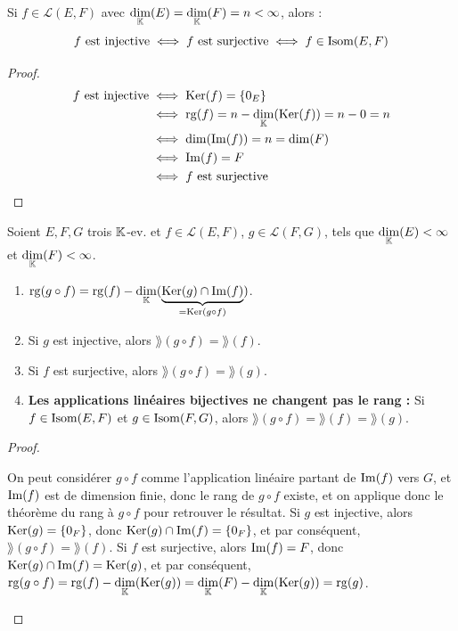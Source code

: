 \documentclass[12pt,a4paper]{report}
\begin{document}
\begin{theorem}
    Si $f \in \mathcal L(E,F)$ avec $\underset{\mathbb{K}}\dim(E) = \underset{\mathbb{K}}\dim(F) = n < \infty$, alors :
    $$f \text{ est injective} \iff f \textrm{ est surjective} \iff f \in \mathrm{Isom}(E,F)$$
\end{theorem}

\begin{proof}
    \begin{align*}
    f \text{ est injective} &\iff \mathrm{Ker}(f) = \{0_E\}\\
    &\iff \mathrm{rg}(f) = n - \underset{\mathbb{K}}\dim(\mathrm{Ker}(f)) = n - 0 = n\\
    &\iff \dim(\mathrm{Im}(f)) = n = \dim(F)\\
    &\iff \mathrm{Im}(f) = F\\
    &\iff f \text{ est surjective}
    \end{align*}
\end{proof}

\begin{property}
    Soient $E, F, G$ trois $\mathbb{K}$-ev. et $f \in \mathcal L(E,F)$, $g \in \mathcal L(F,G)$, tels que $\underset{\mathbb{K}}\dim(E) < \infty$ et $\underset{\mathbb{K}}\dim(F) < \infty$.

    \begin{enumerate}
        \item $\mathrm{rg}(g\circ f) = \mathrm{rg}(f) - \underset{\mathbb{K}}\dim(\underbrace{\mathrm{Ker}(g) \cap \mathrm{Im}(f)}_{=\mathrm{Ker}(g\circ f)})$.
        \item Si $g$ est injective, alors $\rang(g\circ f) = \rang(f)$.
        \item Si $f$ est surjective, alors $\rang(g\circ f) = \rang(g)$.
        \item \textbf{Les applications linéaires bijectives ne changent pas le rang :} Si $f \in \mathrm{Isom}(E,F)$ et $g \in \mathrm{Isom}(F,G)$, alors $\rang(g\circ f) = \rang(f) = \rang(g)$.
    \end{enumerate}
\end{property}

\begin{proof}
    \begin{outline}[enumerate]
    \1 On peut considérer $g\circ f$ comme l'application linéaire partant de $\mathrm{Im}(f)$ vers $G$, et $\mathrm{Im}(f)$ est de dimension finie, donc le rang de $g\circ f$ existe, et on applique donc le théorème du rang à $g\circ f$ pour retrouver le résultat.
    \1 Si $g$ est injective, alors $\mathrm{Ker}(g) = \{0_F\}$, donc $\mathrm{Ker}(g) \cap \mathrm{Im}(f) = \{0_F\}$, et par conséquent, $\rang(g\circ f) = \rang(f)$.
    \1 Si $f$ est surjective, alors $\mathrm{Im}(f) = F$, donc $\mathrm{Ker}(g) \cap \mathrm{Im}(f) = \mathrm{Ker}(g)$, et par conséquent, $\mathrm{rg}(g\circ f) = \mathrm{rg}(f) - \underset{\mathbb{K}}\dim(\mathrm{Ker}(g)) = \underset{\mathbb{K}}\dim(F) - \underset{\mathbb{K}}\dim(\mathrm{Ker}(g)) = \mathrm{rg}(g)$.
    \end{outline}
\end{proof}
\end{document}
